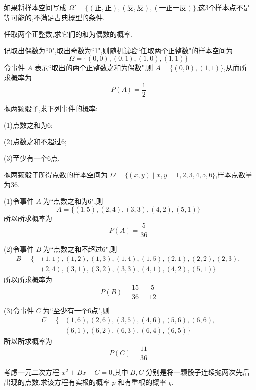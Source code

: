 \begin{note}
    \indent 如果将样本空间写成 $\varOmega' = \{ (\text{正}, \text{正}), (\text{反}, \text{反}), (\text{一正一反}) \}$,这3个样本点不是等可能的,不满足古典概型的条件.
\end{note}

\question 任取两个正整数,求它们的和为偶数的概率.

\begin{solution}
    记取出偶数为``0",取出奇数为``1",则随机试验``任取两个正整数"的样本空间为
    $$
    \varOmega = \{ (0,0), (0,1), (1,0), (1,1) \}
    $$
    令事件 $A$ 表示``取出的两个正整数之和为偶数",则 $A = \{ (0,0), (1,1) \}$,从而所求概率为 $$P(A) = \dfrac{1}{2}$$
\end{solution}

\question 抛两颗骰子,求下列事件的概率:

(1)点数之和为6;

(2)点数之和不超过6;

(3)至少有一个6点.

\begin{solution}
    抛两颗骰子所得点数的样本空间为 $\varOmega = \{ (x,y) \mid x,y=1,2,3,4,5,6 \}$,样本点数量为36.

    (1)令事件 $A$ 为``点数之和为6",则
    $$
    A = \{ (1,5), (2,4), (3,3), (4,2), (5,1) \}
    $$
    所以所求概率为
    $$
    P(A) = \dfrac{5}{36}
    $$

    (2)令事件 $B$ 为``点数之和不超过6",则
    $$
    \begin{aligned}
        B = \{ & (1,1), (1,2), (1,3), (1,4), (1,5), (2,1), (2,2), (2,3), \\
        & (2,4), (3,1), (3,2), (3,3), (4,1), (4,2), (5,1) \}
    \end{aligned}
    $$
    所以所求概率为
    $$
    P(B) = \dfrac{15}{36} = \dfrac{5}{12}
    $$

    (3)令事件 $C$ 为``至少有一个6点",则
    $$
    \begin{aligned}
        C = \{ & (1,6), (2,6), (3,6), (4,6), (5,6), (6,6), \\
        & (6,1), (6,2), (6,3), (6,4), (6,5) \}
    \end{aligned}
    $$
    所以所求概率为
    $$
    P(C) = \dfrac{11}{36}
    $$
\end{solution}

\question 考虑一元二次方程 $x^2 + Bx + C = 0$,其中 $B,C$ 分别是将一颗骰子连续抛两次先后出现的点数,求该方程有实根的概率 $p$ 和有重根的概率 $q$.

